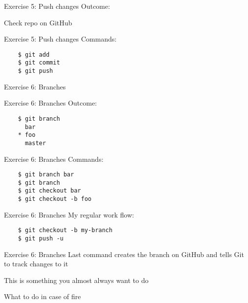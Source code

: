 \documentclass{beamer}
\begin{document}
\begin{frame}{Exercise 5: Push changes}
  Outcome:

  Check repo on GitHub
\end{frame}

\begin{frame}[fragile]{Exercise 5: Push changes}
  Commands:

  \begin{verbatim}
    $ git add
    $ git commit
    $ git push
  \end{verbatim}
\end{frame}

\begin{frame}{}
  \center
  \Huge Exercise 6: Branches
\end{frame}

\begin{frame}[fragile]{Exercise 6: Branches}
  Outcome:

  \begin{verbatim}
    $ git branch
      bar
    * foo
      master
  \end{verbatim}
\end{frame}

\begin{frame}[fragile]{Exercise 6: Branches}
  Commands:

  \begin{verbatim}
    $ git branch bar
    $ git branch
    $ git checkout bar
    $ git checkout -b foo
  \end{verbatim}
\end{frame}

\begin{frame}[fragile]{Exercise 6: Branches}
  My regular work flow:

  \begin{verbatim}
    $ git checkout -b my-branch
    $ git push -u
  \end{verbatim}
\end{frame}

\begin{frame}{Exercise 6: Branches}
  \center
  \Large
  Last command creates the branch on GitHub and tells Git to track changes to it
  \pause

  This is something you almost always want to do

\end{frame}

\begin{frame}{}
  \center
  \Huge What to do in case of fire
\end{frame}
\end{document}
